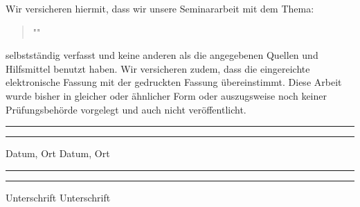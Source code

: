 Wir versicheren hiermit, dass wir unsere Seminararbeit mit dem Thema:    \begin{quote}
"\ThesisTitle "
\end{quote} selbstständig verfasst und keine anderen als die angegebenen Quellen und Hilfsmittel benutzt haben. Wir versicheren zudem, dass die eingereichte elektronische Fassung mit der
gedruckten Fassung übereinstimmt.
Diese Arbeit wurde bisher in gleicher oder ähnlicher Form oder auszugsweise
noch keiner Prüfungsbehörde vorgelegt und auch nicht veröffentlicht.

\vspace{50pt} 
\noindent\rule{5cm}{.4pt}\hfill\rule{5cm}{.4pt}\par 
\noindent Datum, Ort \hfill Datum, Ort
\par
\par
\noindent\rule{5cm}{.4pt}\hfill\rule{5cm}{.4pt}\par 
\noindent Unterschrift \hfill Unterschrift

